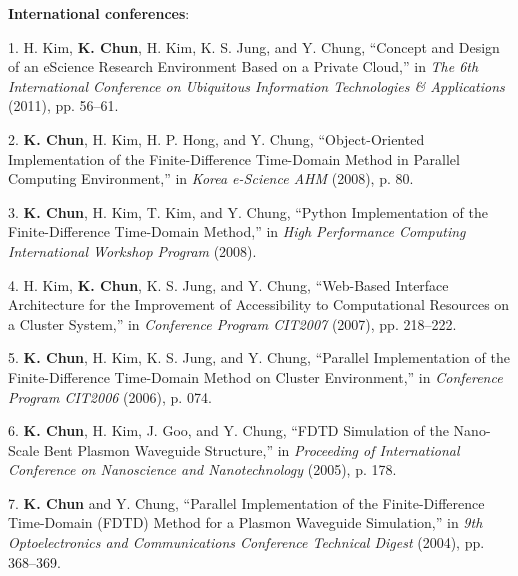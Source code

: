 \documentclass{gist}
\begin{document}
\begin{publication}{2cm}
\item[]\hspace{-\labelwidth}\hspace{-\labelsep}\textbf{International conferences}:
\item[1.] H. Kim, \textbf{K. Chun}, H. Kim, K. S. Jung, and Y. Chung, ``Concept and Design of an eScience Research Environment Based on a Private Cloud,'' in \textit{The 6th International Conference on Ubiquitous Information Technologies \& Applications} (2011), pp. 56–61.
\item[2.] \textbf{K. Chun}, H. Kim, H. P. Hong, and Y. Chung, ``Object-Oriented Implementation of the Finite-Difference Time-Domain Method in Parallel Computing Environment,'' in \textit{Korea e-Science AHM} (2008), p. 80.
\item[3.] \textbf{K. Chun}, H. Kim, T. Kim, and Y. Chung, ``Python Implementation of the Finite-Difference Time-Domain Method,'' in \textit{High Performance Computing International Workshop Program} (2008).
\item[4.] H. Kim, \textbf{K. Chun}, K. S. Jung, and Y. Chung, ``Web-Based Interface Architecture for the Improvement of Accessibility to Computational Resources on a Cluster System,'' in \textit{Conference Program CIT2007} (2007), pp. 218–222.
\item[5.] \textbf{K. Chun}, H. Kim, K. S. Jung, and Y. Chung, ``Parallel Implementation of the Finite-Difference Time-Domain Method on Cluster Environment,'' in \textit{Conference Program CIT2006} (2006), p. 074.
\item[6.] \textbf{K. Chun}, H. Kim, J. Goo, and Y. Chung, ``FDTD Simulation of the Nano-Scale Bent Plasmon Waveguide Structure,'' in \textit{Proceeding of International Conference on Nanoscience and Nanotechnology} (2005), p. 178.
\item[7.] \textbf{K. Chun} and Y. Chung, ``Parallel Implementation of the Finite-Difference Time-Domain (FDTD) Method for a Plasmon Waveguide Simulation,'' in \textit{9th Optoelectronics and Communications Conference Technical Digest} (2004), pp. 368–369.



\end{publication}
\end{document}
